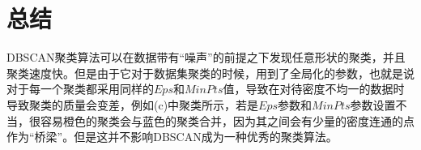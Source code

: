 \documentclass[UTF8, 12pt]{ctexart}
\begin{document}
\section{总结}
DBSCAN聚类算法可以在数据带有“噪声”的前提之下发现任意形状的聚类，并且聚类速度快。但是由于它对于数据集聚类的时候，用到了全局化的参数，也就是说对于每一个聚类都采用同样的$Eps$和$MinPts$值，导致在对待密度不均一的数据时导致聚类的质量会变差，例如(c)中聚类所示，若是$Eps$参数和$MinPts$参数设置不当，很容易橙色的聚类会与蓝色的聚类合并，因为其之间会有少量的密度连通的点作为“桥梁”。但是这并不影响DBSCAN成为一种优秀的聚类算法。
  
  
\end{document}
